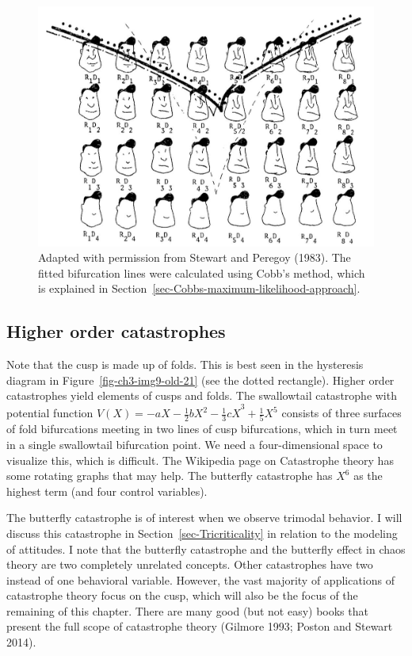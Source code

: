 \documentclass[
  a4paper,
  DIV=11,
  numbers=noendperiod]{scrreprt}
\begin{document}
\begin{figure}

{\centering \includegraphics{media/ch3/image14.jpg}

}

\caption{\label{fig-ch3-img14-old-26}Adapted with permission from
Stewart and Peregoy (1983). The fitted bifurcation lines were calculated
using Cobb's method, which is explained in
Section~\ref{sec-Cobbs-maximum-likelihood-approach}.}

\end{figure}

\hypertarget{sec-Higher-order-catastrophes}{%
\subsection{Higher order
catastrophes}\label{sec-Higher-order-catastrophes}}

Note that the cusp is made up of folds. This is best seen in the
hysteresis diagram in Figure~\ref{fig-ch3-img9-old-21} (see the dotted
rectangle). Higher order catastrophes yield elements of cusps and folds.
The swallowtail catastrophe with potential function
\(V(X) = {- aX - \frac{1}{2}bX^{2} - \frac{1}{3}cX}^{3} + \frac{1}{5}X^{5}\)
consists of three surfaces of fold bifurcations meeting in two lines of
cusp bifurcations, which in turn meet in a single swallowtail
bifurcation point. We need a four-dimensional space to visualize this,
which is difficult. The Wikipedia page on Catastrophe theory has some
rotating graphs that may help. The butterfly catastrophe has \(X^{6}\)
as the highest term (and four control variables).

The butterfly catastrophe is of interest when we observe trimodal
behavior. I will discuss this catastrophe in
Section~\ref{sec-Tricriticality} in relation to the modeling of
attitudes. I note that the butterfly catastrophe and the butterfly
effect in chaos theory are two completely unrelated concepts. Other
catastrophes have two instead of one behavioral variable. However, the
vast majority of applications of catastrophe theory focus on the cusp,
which will also be the focus of the remaining of this chapter. There are
many good (but not easy) books that present the full scope of
catastrophe theory (Gilmore 1993; Poston and Stewart 2014).
\end{document}

